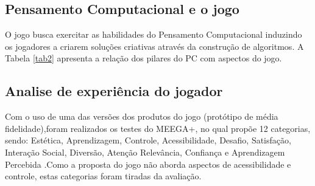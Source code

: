 \documentclass[10pt, conference, compsocconf]{IEEEtran}
\begin{document}
\subsection{Pensamento Computacional e o jogo}
O jogo busca exercitar as habilidades do Pensamento Computacional induzindo os jogadores a criarem soluções criativas através da construção de algoritmos. A Tabela \ref{tab2} apresenta a relação dos pilares do PC com aspectos do jogo.

\subsection{Analise de experiência do jogador}
Com o uso de uma das versões dos produtos do jogo (protótipo de média fidelidade),foram realizados os testes do MEEGA+, no qual propõe 12 categorias, sendo: Estética, Aprendizagem, Controle, Acessibilidade, Desafio, Satisfação, Interação Social, Diversão, Atenção Relevância, Confiança e Aprendizagem Percebida \cite{von2018meega+}.Como a proposta do jogo não aborda aspectos de acessibilidade e controle, estas categorias foram tiradas da avaliação.
\end{document}
